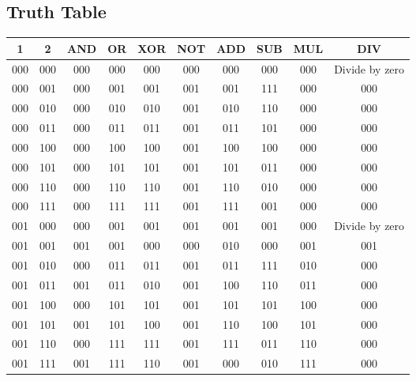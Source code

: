 \documentclass{aiaa-tc}
\begin{document}
 \subsection{Truth Table}
 \begin{center}
     \begin{tabular}{ |c|c|c|c|c|c|c|c|c|c| }
     \hline
     1 & 2 & AND & OR & XOR & NOT & ADD & SUB & MUL & DIV  \\ \hline \hline
     000 & 000 & 000 & 000 & 000 & 000 & 000 & 000 & 000 & Divide by zero\\ \hline
     000 & 001 & 000 & 001 & 001 & 001 & 001 & 111 & 000 & 000\\ \hline
     000 & 010 & 000 & 010 & 010 & 001 & 010 & 110 & 000 & 000\\ \hline
     000 & 011 & 000 & 011 & 011 & 001 & 011 & 101 & 000 & 000\\ \hline
     000 & 100 & 000 & 100 & 100 & 001 & 100 & 100 & 000 & 000\\ \hline
     000 & 101 & 000 & 101 & 101 & 001 & 101 & 011 & 000 & 000\\ \hline
     000 & 110 & 000 & 110 & 110 & 001 & 110 & 010 & 000 & 000\\ \hline
     000 & 111 & 000 & 111 & 111 & 001 & 111 & 001 & 000 & 000\\ \hline
     001 & 000 & 000 & 001 & 001 & 001 & 001 & 001 & 000 & Divide by zero\\ \hline
     001 & 001 & 001 & 001 & 000 & 000 & 010 & 000 & 001 & 001\\ \hline
     001 & 010 & 000 & 011 & 011 & 001 & 011 & 111 & 010 & 000\\ \hline
     001 & 011 & 001 & 011 & 010 & 001 & 100 & 110 & 011 & 000\\ \hline
     001 & 100 & 000 & 101 & 101 & 001 & 101 & 101 & 100 & 000\\ \hline
     001 & 101 & 001 & 101 & 100 & 001 & 110 & 100 & 101 & 000\\ \hline
     001 & 110 & 000 & 111 & 111 & 001 & 111 & 011 & 110 & 000\\ \hline
     001 & 111 & 001 & 111 & 110 & 001 & 000 & 010 & 111 & 000\\ \hline
 \end{tabular}
 \end{center}
\end{document}
